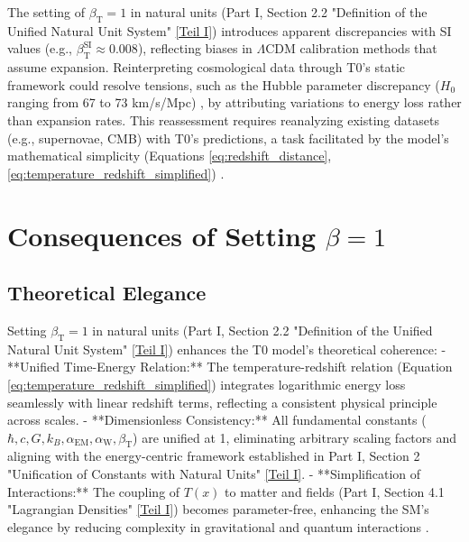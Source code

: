 \documentclass[12pt,a4paper]{article}
\newcommand{\Tfield}{T(x)}
\newcommand{\alphaEM}{\alpha_{\text{EM}}}
\newcommand{\alphaW}{\alpha_{\text{W}}}
\newcommand{\betaT}{\beta_{\text{T}}}
\begin{document}
	The setting of \(\betaT = 1\) in natural units (Part I, Section 2.2 "Definition of the Unified Natural Unit System" \href{https://github.com/jpascher/T0-Time-Mass-Duality/tree/main/2/pdf/English/Bridging Quantum Mechanics and Relativity through Time-Mass Duality Part I Theoretical Foundations_en.pdf}{[Teil I]}) introduces apparent discrepancies with SI values (e.g., \(\betaT^{\text{SI}} \approx 0.008\)), reflecting biases in \(\Lambda\)CDM calibration methods that assume expansion. Reinterpreting cosmological data through T0’s static framework could resolve tensions, such as the Hubble parameter discrepancy (\(H_0\) ranging from 67 to 73 km/s/Mpc) \cite{DiValentino2021}, by attributing variations to energy loss rather than expansion rates. This reassessment requires reanalyzing existing datasets (e.g., supernovae, CMB) with T0’s predictions, a task facilitated by the model’s mathematical simplicity (Equations \ref{eq:redshift_distance}, \ref{eq:temperature_redshift_simplified}) \cite{pascher_alphabeta_2025}.
	
	\section{Consequences of Setting \(\beta = 1\)}
	\label{sec:consequences_beta}
	
	\subsection{Theoretical Elegance}
	\label{subsec:theoretical_elegance}
	
	Setting \(\betaT = 1\) in natural units (Part I, Section 2.2 "Definition of the Unified Natural Unit System" \href{https://github.com/jpascher/T0-Time-Mass-Duality/tree/main/2/pdf/English/Bridging Quantum Mechanics and Relativity through Time-Mass Duality Part I Theoretical Foundations_en.pdf}{[Teil I]}) enhances the T0 model’s theoretical coherence:
	- **Unified Time-Energy Relation:** The temperature-redshift relation (Equation \ref{eq:temperature_redshift_simplified}) integrates logarithmic energy loss seamlessly with linear redshift terms, reflecting a consistent physical principle across scales.
	- **Dimensionless Consistency:** All fundamental constants (\(\hbar, c, G, k_B, \alphaEM, \alphaW, \betaT\)) are unified at 1, eliminating arbitrary scaling factors and aligning with the energy-centric framework established in Part I, Section 2 "Unification of Constants with Natural Units" \href{https://github.com/jpascher/T0-Time-Mass-Duality/tree/main/2/pdf/English/Bridging Quantum Mechanics and Relativity through Time-Mass Duality Part I Theoretical Foundations_en.pdf}{[Teil I]}.
	- **Simplification of Interactions:** The coupling of \(\Tfield\) to matter and fields (Part I, Section 4.1 "Lagrangian Densities" \href{https://github.com/jpascher/T0-Time-Mass-Duality/tree/main/2/pdf/English/Bridging Quantum Mechanics and Relativity through Time-Mass Duality Part I Theoretical Foundations_en.pdf}{[Teil I]}) becomes parameter-free, enhancing the SM’s elegance by reducing complexity in gravitational and quantum interactions \cite{pascher_alphabeta_2025}.
	
\end{document}
